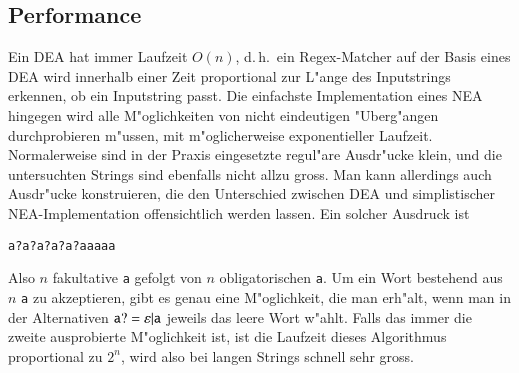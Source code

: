 \subsection{Performance}
Ein DEA hat immer Laufzeit $O(n)$, d.\,h.~ein Regex-Matcher auf der
Basis eines DEA wird innerhalb einer Zeit proportional zur
L"ange des Inputstrings erkennen, ob ein Inputstring passt.
Die einfachste Implementation eines NEA hingegen wird alle M"oglichkeiten
von nicht eindeutigen "Uberg"angen durchprobieren m"ussen, mit
m"oglicherweise exponentieller Laufzeit. Normalerweise sind in der
Praxis eingesetzte regul"are Ausdr"ucke klein, und die untersuchten
Strings sind ebenfalls nicht allzu gross. Man kann allerdings auch
Ausdr"ucke konstruieren, die den Unterschied zwischen DEA und simplistischer
NEA-Implementation offensichtlich werden lassen. Ein solcher Ausdruck
ist
\begin{center}
\tt a?a?a?a?a?aaaaa
\end{center}
Also $n$ fakultative {\tt a} gefolgt von $n$ obligatorischen {\tt a}.
Um ein Wort bestehend aus $n$ {\tt a} zu akzeptieren, gibt es genau eine
M"oglichkeit, die man erh"alt, wenn man in der Alternativen
${\tt a?} = \varepsilon|{\tt a}$
jeweils das leere Wort w"ahlt. Falls das immer die zweite ausprobierte 
M"oglichkeit ist, ist die Laufzeit dieses Algorithmus proportional zu
$2^n$, wird also bei langen Strings schnell sehr gross.

